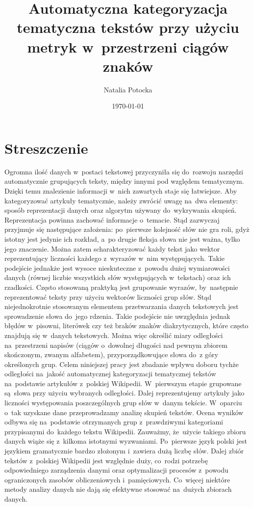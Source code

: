 \documentclass{praca1}
\author{Natalia Potocka}
\title{Automatyczna kategoryzacja tematyczna tekstów przy użyciu metryk w~przestrzeni ciągów znaków}
\date{\today}
\begin{document}
\maketitle


\section*{Streszczenie}

Ogromna ilość danych w~postaci tekstowej przyczyniła się do~rozwoju narzędzi automatycznie grupujących teksty, między innymi pod względem tematycznym. Dzięki temu znalezienie informacji w~nich zawartych staje się łatwiejsze. Aby kategoryzować artykuły tematycznie, należy zwrócić uwagę na~dwa elementy: sposób reprezentacji danych oraz algorytm używany do~wykrywania skupień. Reprezentacja powinna zachować informacje o~temacie. Stąd zazwyczaj przyjmuje się następujące założenia: po~pierwsze kolejność słów nie gra roli, gdyż istotny jest jedynie ich rozkład, a~po drugie fleksja słowa nie jest ważna, tylko jego znaczenie. Można zatem scharakteryzować każdy tekst jako wektor reprezentujący liczności każdego z~wyrazów w~nim występujących. Takie podejście jednakże jest wysoce nieskuteczne z~powodu dużej wymiarowości danych (równej liczbie wszystkich słów występujących w~tekstach) oraz ich rzadkości. Często stosowaną praktyką jest grupowanie wyrazów, by~następnie reprezentować teksty przy użyciu wektorów liczności grup słów. Stąd niejednokrotnie stosowanym elementem przetwarzania danych tekstowych jest sprowadzenie słowa do~jego rdzenia. Takie podejście nie uwzględnia jednak błędów w~pisowni, literówek czy też braków znaków diakrytycznych, które często znajdują się w~danych tekstowych. Można więc określić miary odległości na~przestrzeni napisów (ciągów o~dowolnej długości nad pewnym zbiorem skończonym, zwanym alfabetem), przyporządkowujące słowa do~z góry określonych grup. Celem niniejszej pracy jest zbadanie wpływu doboru tychże odległości na~jakość automatycznej kategoryzacji tematycznej tekstów na~podstawie artykułów z~polskiej Wikipedii. W~pierwszym etapie grupowane są~słowa przy użyciu wybranych odległości. Dalej reprezentujemy artykuły jako liczności występowania poszczególnych grup słów w~danym tekście. W~oparciu o~tak uzyskane dane przeprowadzamy analizę skupień tekstów. Ocena wyników odbywa się na~podstawie otrzymanych grup z~prawdziwymi kategoriami przypisanymi do~każdego tekstu Wikipedii. Zauważmy, że~użycie takiego zbioru danych wiąże się z~kilkoma istotnymi wyzwaniami. Po~pierwsze język polski jest językiem gramatycznie bardzo złożonym i~zawiera dużą liczbę słów. Dalej zbiór tekstów z~polskiej Wikipedii jest względnie duży, co~rodzi potrzebę odpowiedniego zarządzenia danymi oraz optymalizacji procesów z~powodu ograniczonych zasobów obliczeniowych i~pamięciowych. Co~więcej niektóre metody analizy danych nie dają się efektywne stosować na~dużych zbiorach danych.
\end{document}
